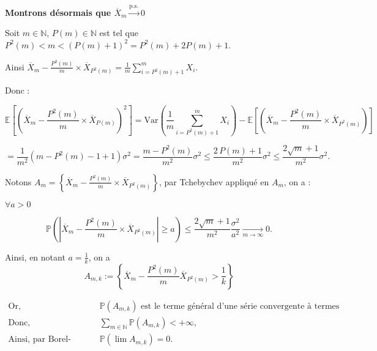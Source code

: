 \documentclass{article}
\begin{document}
\noindent
\textbf{Montrons désormais que $\overline{X}_m \xrightarrow{\text{p.s.}} 0$}
\vspace{0.5cm}


\noindent
Soit $m \in \mathbb{N}$, $P(m) \in \mathbb{N}$ est tel que $P^2(m) < m < (P(m)+1)^2 = P^2(m)+2P(m)+1$. 

\noindent
Ainsi $\overline{X}_m - \frac{P^2(m)}{m} \times \overline{X}_{P^2(m)} = \frac{1}{m} \sum_{i=P^2(m)+1}^{m} X_i$.

\vspace{0,8cm}
\noindent
Donc : 

\[
\mathbb{E} \left[\left(\overline{X}_m - \frac{P^2(m)}{m} \times \overline{X}_{P(m)}\right)^2\right] = \text{Var}\left(\frac{1}{m} \sum_{i=P^2(m)+1}^{m} X_i\right) - \mathbb{E} \left[\left(\overline{X}_m - \frac{P^2(m)}{m} \times \overline{X}_{P^2(m)}\right)\right]
\]

\[
= \frac{1}{m^2} (m - P^2(m) - 1 + 1) \sigma^2 = \frac{m - P^2(m)}{m^2} \sigma^2 \leq \frac{2 \, P(m) + 1}{m^2} \sigma^2 \leq \frac{2 \sqrt{m} + 1}{m^2} \sigma^2.
\]

\vspace{0,6cm}
Notons $A_{m} = \left\{ \overline{X}_m - \frac{P^2(m)}{m} \times \overline{X}_{P^2(m)} \right\}$, par Tchebychev appliqué en $A_m$, on a : 

\vspace{0,6cm}

$\forall a > 0$

\[
\mathbb{P}\left(\left|\overline{X}_m - \frac{P^2(m)}{m} \times \overline{X}_{P^2(m)}\right| \geq a\right) \leq \frac{2 \sqrt{m} + 1}{m^2} \frac{\sigma^2}{a^2} \xrightarrow[m \to \infty]{} 0.
\]

Ainsi, en notant \( a = \frac{1}{k} \), on a 
\[
A_{m,k} := \left\{ \overline{X}_m - \frac{P^2(m)}{m} {\overline{X}_{P^2(m)}} > \frac{1}{k} \right\}
\]

\begin{equation*}
\begin{aligned}
\text{Or, } & \quad \mathbb{P}(A_{m,k}) \text{ est le terme général d'une série convergente à termes positifs} \\
\text{Donc, } & \quad \sum_{m \in \mathbb{N}} \mathbb{P}(A_{m,k}) < +\infty, \\
\text{Ainsi, par Borel-Cantelli, } & \quad \mathbb{P}(\lim A_{m,k}) = 0.
\end{aligned}
\end{equation*}
\end{document}
